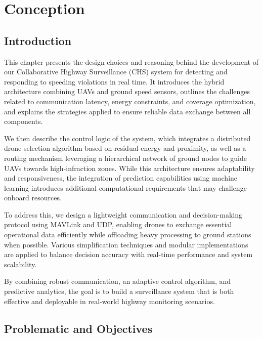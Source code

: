 \chapter{Conception}


\section*{Introduction}

This chapter presents the design choices and reasoning behind the development of our Collaborative Highway Surveillance (CHS) system for detecting and responding to speeding violations in real time. It introduces the hybrid architecture combining UAVs and ground speed sensors, outlines the challenges related to communication latency, energy constraints, and coverage optimization, and explains the strategies applied to ensure reliable data exchange between all components.

We then describe the control logic of the system, which integrates a distributed drone selection algorithm based on residual energy and proximity, as well as a routing mechanism leveraging a hierarchical network of ground nodes to guide UAVs towards high-infraction zones. While this architecture ensures adaptability and responsiveness, the integration of prediction capabilities using machine learning introduces additional computational requirements that may challenge onboard resources.

To address this, we design a lightweight communication and decision-making protocol using MAVLink and UDP, enabling drones to exchange essential operational data efficiently while offloading heavy processing to ground stations when possible. Various simplification techniques and modular implementations are applied to balance decision accuracy with real-time performance and system scalability.

By combining robust communication, an adaptive control algorithm, and predictive analytics, the goal is to build a surveillance system that is both effective and deployable in real-world highway monitoring scenarios.


\section{Problematic and Objectives}

